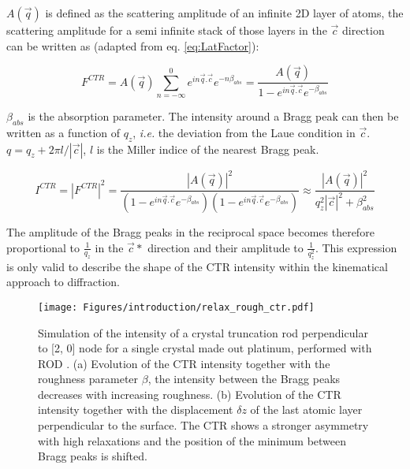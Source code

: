 $A(\vec{q})$ is defined as the scattering amplitude of an infinite 2D layer of atoms, the scattering amplitude for a semi infinite stack of those layers in the $\vec{c}$ direction can be written as (adapted from eq. \ref{eq:LatFactor}):

\begin{equation}
    \label{eq:CTR1}
    F^{CTR} = A(\vec{q})\sum_{n=-\infty}^0 e^{in\vec{q}.\vec{c}} e^{-n\beta_{abs}} = \frac{A(\vec{q})}{1 - e^{in\vec{q}.\vec{c}} e^{-\beta_{abs}}}
\end{equation}

$\beta_{abs}$ is the absorption parameter.
The intensity around a Bragg peak can then be written as a function of $q_z$, \textit{i.e.} the deviation from the Laue condition in $\vec{c}$.
$q = q_z + 2\pi l/|\vec{c}|$, $l$ is the Miller indice of the nearest Bragg peak.

\begin{equation}
    \label{eq:CTR2}
    I^{CTR} = |F^{CTR}|^2 = \frac{|A(\vec{q})|^2}{(1 - e^{in\vec{q}.\vec{c}} e^{-\beta_{abs}})(1 - e^{in\vec{q}.\vec{c}} e^{-\beta_{abs}})} \approx \frac{|A(\vec{q})|^2}{q_z^2 |\vec{c}|^2 + \beta_{abs}^2 }
\end{equation}

The amplitude of the Bragg peaks in the reciprocal space becomes therefore proportional to $\frac{1}{q_z}$ in the $\vec{c}*$ direction and their amplitude to $\frac{1}{q_z^2}$.
This expression is only valid to describe the shape of the CTR intensity within the kinematical approach to diffraction.

\begin{figure}[!htb]
    \centering
    \texttt{[image: Figures/introduction/relax\_rough\_ctr.pdf]}
    \caption{
    Simulation of the intensity of a crystal truncation rod perpendicular to [2, 0] node for a single crystal made out platinum, performed with ROD \parencite{Vlieg2000}.
    (a) Evolution of the CTR intensity together with the roughness parameter $\beta$, the intensity between the Bragg peaks decreases with increasing roughness.
    (b) Evolution of the CTR intensity together with the displacement $\delta z$ of the last atomic layer perpendicular to the surface.
    The CTR shows a stronger asymmetry with high relaxations and the position of the minimum between Bragg peaks is shifted.
    }
    \label{fig:CTRSimulation}
\end{figure}

